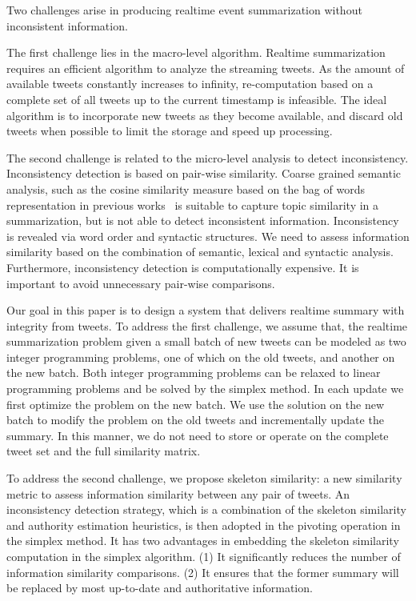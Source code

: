 \documentclass[envcountsame]{llncs}
\begin{document}
Two challenges arise in producing realtime event summarization without inconsistent information.

The first challenge lies in the macro-level algorithm. Realtime summarization requires an efficient algorithm to analyze the streaming tweets. As the amount of available tweets constantly increases to infinity, re-computation based on a complete set of all tweets up to the current timestamp is infeasible. The ideal algorithm is to  incorporate new tweets as they become available, and discard old tweets when possible to limit the storage and speed up processing.

The second challenge is related to the micro-level analysis to detect inconsistency. Inconsistency detection is based on pair-wise similarity. Coarse grained semantic analysis, such as the cosine similarity measure based on the bag of words representation in previous works~\cite{Takamura2011Summarizing,Lin2012Generating,Rudra2015Extracting,Shou2013Sumblr,Liu2016LEDS,Gillani2017Post,Zubiaga2012Towards,Sharifi2010Summarizing} is suitable to capture topic similarity in a summarization, but is not able to detect inconsistent information. Inconsistency is revealed via word order and syntactic structures. We need to assess information similarity based on the combination of semantic, lexical and syntactic analysis. Furthermore, inconsistency detection is computationally expensive. It is important to avoid unnecessary pair-wise comparisons.

Our goal in this paper is to design a system that delivers realtime summary with integrity from tweets. To address the first challenge, we assume that, the realtime summarization problem given a small batch of new tweets can be modeled as two integer programming problems, one of which on the old tweets, and another on the new batch. Both integer programming problems can be relaxed to linear programming problems and be solved by the simplex method. In each update we first optimize the problem on the new batch. We use the solution on the new batch to modify the problem on the old tweets and incrementally update the summary.  In this manner, we do not need to store or operate on the complete tweet set and the full similarity matrix.

To address the second challenge, we propose skeleton similarity: a new similarity metric to assess information similarity between any pair of tweets. An inconsistency detection strategy, which is a combination of the skeleton similarity and authority estimation heuristics, is then adopted in the pivoting operation in the simplex method. It has two advantages in embedding the skeleton similarity computation in the simplex algorithm. (1) It significantly reduces the number of information similarity comparisons. (2) It ensures that the former summary will be replaced by most up-to-date and authoritative information.
\end{document}
